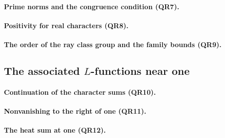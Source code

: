 \paragraph{Prime norms and the congruence condition (QR7).}



\paragraph{Positivity for real characters (QR8).}



\paragraph{The order of the ray class group and the family bounds (QR9).}



\subsection{The associated $L$-functions near one}

\paragraph{Continuation of the character sums (QR10).}



\paragraph{Nonvanishing to the right of one (QR11).}



\paragraph{The heat sum at one (QR12).}

